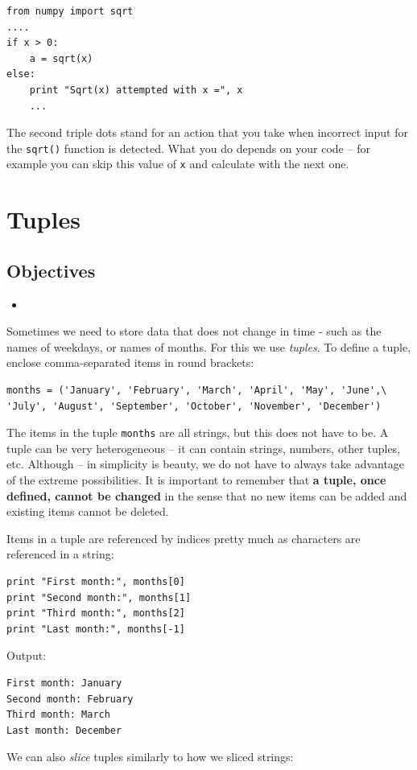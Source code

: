 \documentclass[article,A4,12pt]{llncs}
\begin{document}
\begin{verbatim}
from numpy import sqrt
....
if x > 0:
    a = sqrt(x)
else:
    print "Sqrt(x) attempted with x =", x
    ...
\end{verbatim}
The second triple dots stand for an action that you take when incorrect 
input for the {\tt sqrt()} function is detected. What you do depends on 
your code -- for example you can skip this value of {\tt x} and calculate 
with the next one. 

\section{Tuples}

\subsection{Objectives}

\begin{itemize}
\item
\end{itemize}

Sometimes we need to store data that does not change in time - such as 
the names of weekdays, or names of months. For this we use {\em tuples}.
To define a tuple, enclose comma-separated items in round brackets: 

\begin{verbatim}
months = ('January', 'February', 'March', 'April', 'May', 'June',\
'July', 'August', 'September', 'October', 'November', 'December')
\end{verbatim}
The items in the tuple {\tt months} are all strings, but this does not 
have to be. A tuple can be very heterogeneous -- it can contain strings,
numbers, other tuples, etc. Although -- in simplicity is beauty, we
do not have to always take advantage of the extreme possibilities.
It is important to remember that {\bf a tuple, once defined, cannot 
be changed} in the sense that no new items can be added and existing 
items cannot be deleted.

Items in a tuple are referenced by indices pretty much as characters 
are referenced in a string:

\begin{verbatim}
print "First month:", months[0]
print "Second month:", months[1]
print "Third month:", months[2]
print "Last month:", months[-1]
\end{verbatim}
Output:

\begin{verbatim}
First month: January
Second month: February
Third month: March
Last month: December
\end{verbatim}
We can also {\em slice} tuples similarly to how we sliced strings:
\end{document}
